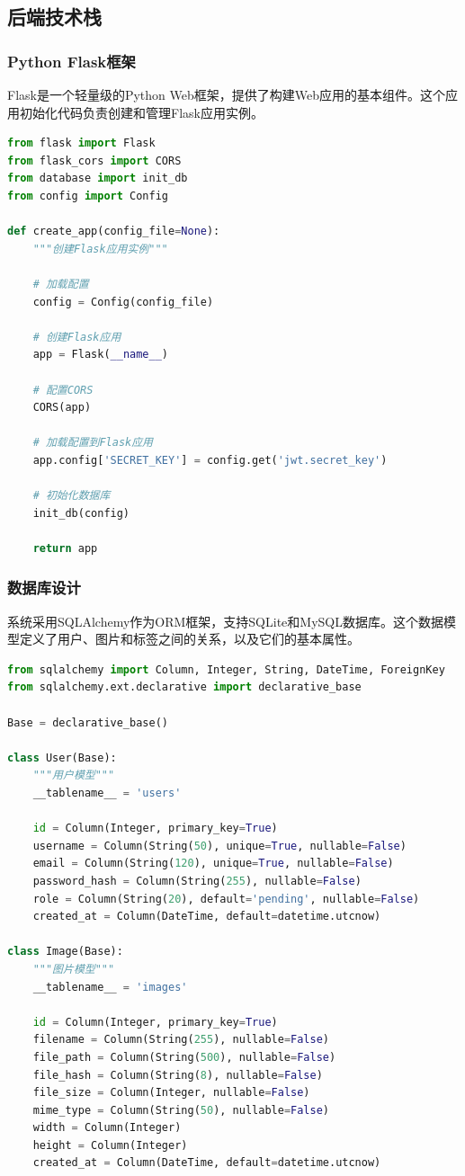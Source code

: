\documentclass[cs4size,a4paper]{ctexart}
\numberwithin{equation}{section}
\numberwithin{table}{section}
\numberwithin{figure}{section}
\begin{document}
\subsection{后端技术栈}

\subsubsection{Python Flask框架}

Flask是一个轻量级的Python Web框架，提供了构建Web应用的基本组件。这个应用初始化代码负责创建和管理Flask应用实例。

\begin{lstlisting}[language=Python,caption=Flask应用核心初始化代码]
from flask import Flask
from flask_cors import CORS
from database import init_db
from config import Config

def create_app(config_file=None):
    """创建Flask应用实例"""

    # 加载配置
    config = Config(config_file)

    # 创建Flask应用
    app = Flask(__name__)

    # 配置CORS
    CORS(app)

    # 加载配置到Flask应用
    app.config['SECRET_KEY'] = config.get('jwt.secret_key')

    # 初始化数据库
    init_db(config)

    return app
\end{lstlisting}

\subsubsection{数据库设计}

系统采用SQLAlchemy作为ORM框架，支持SQLite和MySQL数据库。这个数据模型定义了用户、图片和标签之间的关系，以及它们的基本属性。

\begin{lstlisting}[language=Python,caption=核心数据模型定义]
from sqlalchemy import Column, Integer, String, DateTime, ForeignKey
from sqlalchemy.ext.declarative import declarative_base

Base = declarative_base()

class User(Base):
    """用户模型"""
    __tablename__ = 'users'

    id = Column(Integer, primary_key=True)
    username = Column(String(50), unique=True, nullable=False)
    email = Column(String(120), unique=True, nullable=False)
    password_hash = Column(String(255), nullable=False)
    role = Column(String(20), default='pending', nullable=False)
    created_at = Column(DateTime, default=datetime.utcnow)

class Image(Base):
    """图片模型"""
    __tablename__ = 'images'

    id = Column(Integer, primary_key=True)
    filename = Column(String(255), nullable=False)
    file_path = Column(String(500), nullable=False)
    file_hash = Column(String(8), nullable=False)
    file_size = Column(Integer, nullable=False)
    mime_type = Column(String(50), nullable=False)
    width = Column(Integer)
    height = Column(Integer)
    created_at = Column(DateTime, default=datetime.utcnow)
\end{lstlisting}
\end{document}
